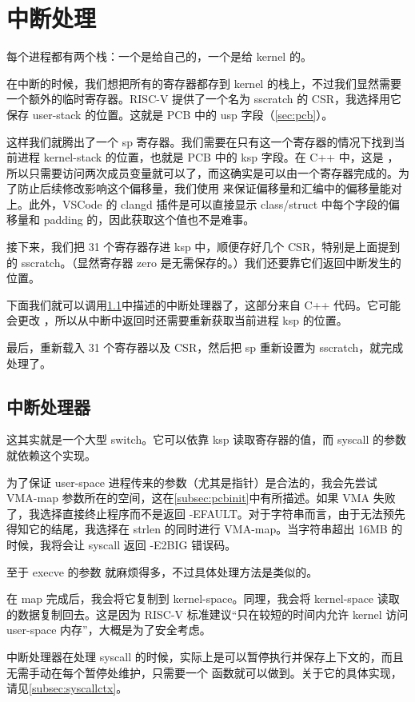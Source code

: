 \section{中断处理}
\label{sec:interrupt}

每个进程都有两个栈：一个是给自己的，一个是给 kernel 的。

在中断的时候，我们想把所有的寄存器都存到 kernel 的栈上，不过我们显然需要一个额外的临时寄存器。RISC-V 提供了一个名为 sscratch 的 CSR，我选择用它保存 user-stack 的位置。这就是 PCB 中的 usp 字段（\cref{sec:pcb}）。

这样我们就腾出了一个 sp 寄存器。我们需要在只有这一个寄存器的情况下找到当前进程 kernel-stack 的位置，也就是 PCB 中的 ksp 字段。在 C++ 中，这是 ，所以只需要访问两次成员变量就可以了，而这确实是可以由一个寄存器完成的。为了防止后续修改影响这个偏移量，我们使用  来保证偏移量和汇编中的偏移量能对上。此外，VSCode 的 clangd 插件是可以直接显示 class/struct 中每个字段的偏移量和 padding 的，因此获取这个值也不是难事。

接下来，我们把 31 个寄存器存进 ksp 中，顺便存好几个 CSR，特别是上面提到的 sscratch。（显然寄存器 zero 是无需保存的。）我们还要靠它们返回中断发生的位置。

下面我们就可以调用\cref{sec:interrupthandler}中描述的中断处理器了，这部分来自 C++ 代码。它可能会更改 ，所以从中断中返回时还需要重新获取当前进程 ksp 的位置。

最后，重新载入 31 个寄存器以及 CSR，然后把 sp 重新设置为 sscratch，就完成处理了。

\subsection{中断处理器}
\label{sec:interrupthandler}

这其实就是一个大型 switch。它可以依靠 ksp 读取寄存器的值，而 syscall 的参数就依赖这个实现。

为了保证 user-space 进程传来的参数（尤其是指针）是合法的，我会先尝试 VMA-map 参数所在的空间，这在\cref{subsec:pcbinit}中有所描述。如果 VMA 失败了，我选择直接终止程序而不是返回 -EFAULT。对于字符串而言，由于无法预先得知它的结尾，我选择在 strlen 的同时进行 VMA-map。当字符串超出 16MB 的时候，我将会让 syscall 返回 -E2BIG 错误码。

至于 execve 的参数  就麻烦得多，不过具体处理方法是类似的。

在 map 完成后，我会将它复制到 kernel-space。同理，我会将 kernel-space 读取的数据复制回去。这是因为 RISC-V 标准\cite{rvPrivManual}建议“只在较短的时间内允许 kernel 访问 user-space 内存”，大概是为了安全考虑。

中断处理器在处理 syscall 的时候，实际上是可以暂停执行并保存上下文的，而且无需手动在每个暂停处维护，只需要一个  函数就可以做到。关于它的具体实现，请见\cref{subsec:syscallctx}。
